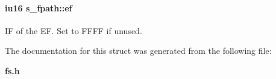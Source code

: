 \paragraph{\setlength{\rightskip}{0pt plus 5cm}\bf{iu16} \bf{s\_\-fpath::ef}}\hfill\label{structs__fpath_e8103a76874a6b0588c88303126477c7}


IF of the EF. Set to FFFF if unused. 



The documentation for this struct was generated from the following file:\begin{CompactItemize}
\item 
\bf{fs.h}\end{CompactItemize}
